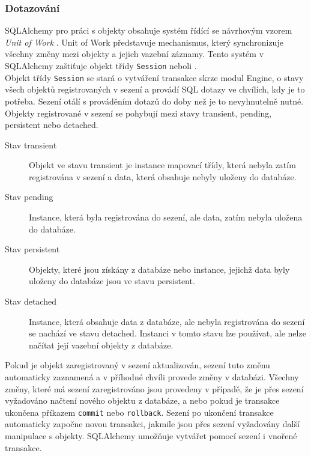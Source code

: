\documentclass[ing,male,java,dept456]{diploma}						%
\begin{document}
\subsubsection{Dotazování}

SQLAlchemy pro práci s objekty obsahuje systém řídící se návrhovým vzorem \textit{Unit of Work} \cite{fowler}. Unit of Work představuje mechanismus, který synchronizuje všechny změny mezi objekty a jejich vazební záznamy. Tento systém v SQLAlchemy zaštiťuje objekt třídy \lstinline[style=inlinepython]|Session| neboli . \\
Objekt třídy \lstinline[style=inlinepython]|Session| se stará o vytváření transakce skrze modul Engine, o stavy všech objektů registrovaných v sezení a provádí SQL dotazy ve chvílích, kdy je to potřeba. Sezení otálí s prováděním dotazů do doby než je to nevyhnutelně nutné. Objekty registrované v sezení se pohybují mezi stavy transient, pending, persistent nebo detached.

\begin{description}
\item[Stav transient] Objekt ve stavu transient je instance mapovací třídy, která nebyla zatím registrována v sezení a data, která obsahuje nebyly uloženy do databáze. 
\item[Stav pending] Instance, která byla registrována do sezení, ale data, zatím nebyla uložena do databáze.
\item[Stav persistent] Objekty, které jsou získány z databáze nebo instance, jejichž data byly uloženy do databáze jsou ve stavu persistent.
\item[Stav detached] Instance, která obsahuje data z databáze, ale nebyla registrována do sezení se nachází ve stavu detached. Instanci v tomto stavu lze používat, ale nelze načítat její vazební objekty z databáze.
\end{description}

Pokud je objekt zaregistrovaný v sezení aktualizován, sezení tuto změnu automaticky zaznamená a v příhodné chvíli provede změny v databázi. Všechny změny, které má sezení zaregistrováno jsou provedeny v případě, že je přes sezení vyžadováno načtení nového objektu z databáze, a nebo pokud je transakce ukončena příkazem \lstinline[style=inlinepython]|commit| nebo \lstinline[style=inlinepython]|rollback|. Sezení po ukončení transakce automaticky započne novou transakci, jakmile jsou přes sezení vyžadovány další manipulace s objekty. SQLAlchemy umožňuje vytvářet pomocí sezení i vnořené transakce. \\
\end{document}
